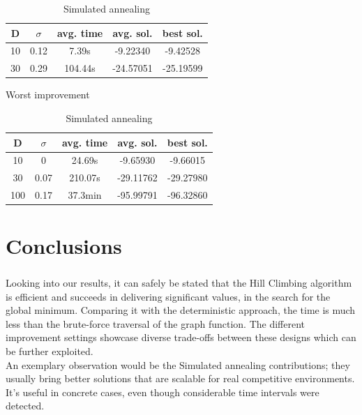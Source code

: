 \documentclass{article}
\begin{document}
\begin{table}[!htbp]
\begin{minipage}{.4\linewidth}
    \centering

    \begin{tabular}{|c|c|c|c|c|}
    \hline
    D   & $\sigma$  & avg. time     & avg. sol.     & best sol. \\
    \hline
    10  & 0.12      & 7.39s         & -9.22340      & -9.42528 \\
    \hline
    30  & 0.29      & 104.44s       & -24.57051     & -25.19599 \\
    \hline
    \end{tabular}
    \caption{Worst improvement}
  \end{minipage}%
  \quad %
  \begin{minipage}{.75\linewidth}
    \centering

    \begin{tabular}{|c|c|c|c|c|}
    \hline
    D   & $\sigma$  & avg. time     & avg. sol.     & best sol. \\
    \hline
    10  & 0         & 24.69s        & -9.65930      & -9.66015 \\
    \hline
    30  & 0.07      & 210.07s       & -29.11762     & -29.27980 \\
    \hline
    100 & 0.17      & 37.3min       & -95.99791     & -96.32860 \\
    \hline
    \end{tabular}
    \caption{Simulated annealing}
  \end{minipage}
\end{table}


\section{Conclusions}

\subparagraph{}
Looking into our results, it can safely be stated that the Hill Climbing algorithm is efficient and succeeds in delivering significant values, in the search for the global minimum. Comparing it with the deterministic approach, the time is much less than the brute-force traversal of the graph function. The different improvement settings showcase diverse trade-offs between these designs which can be further exploited. \\

An exemplary observation would be the Simulated annealing contributions; they usually bring better solutions that are scalable for real competitive environments. It's useful in concrete cases, even though considerable time intervals were detected. \\
\end{document}
